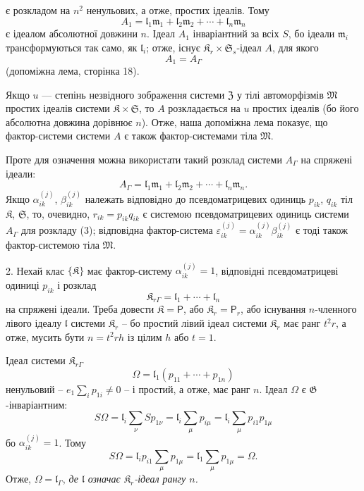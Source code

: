 \documentclass[11pt]{article}
\begin{document}
є розкладом на \(n^2\) ненульових, а отже, простих ідеалів. Тому
\[
A_1=\mathfrak l_1\mathfrak m_1+\mathfrak l_2\mathfrak m_2+\cdots+\mathfrak l_n\mathfrak m_n
\]
є ідеалом абсолютної довжини \(n\). Ідеал \(A_1\) інваріантний за всіх \(S\), бо ідеали \(\mathfrak m_i\) трансформуються так само, як \(\mathfrak l_i\); отже, існує \(\mathfrak K_r\times\mathfrak S_s\)-ідеал \(A\), для якого
\[
A_1=A_\Gamma
\]
(допоміжна лема, сторінка 18).

Якщо \(u\) --- степінь незвідного зображення системи \(\mathfrak Z\) у тілі автоморфізмів \(\mathfrak M\) простих ідеалів системи \(\mathfrak K\times\mathfrak S\), то \(A\) розкладається на \(u\) простих ідеалів (бо його абсолютна довжина дорівнює \(n\)). Отже, наша допоміжна лема показує, що фактор-системи системи \(A\) є також фактор-системами тіла \(\mathfrak M\).

Проте для означення можна використати такий розклад системи \(A_\Gamma\) на спряжені ідеали:
\[
\tag{3}
A_\Gamma=\mathfrak l_1\mathfrak m_1+\mathfrak l_2\mathfrak m_2+\cdots+\mathfrak l_n\mathfrak m_n.
\]
Якщо \(\alpha_{ik}^{(j)}\), \(\beta_{ik}^{(j)}\) належать відповідно до псевдоматрицевих одиниць \(p_{ik}\), \(q_{ik}\) тіл \(\mathfrak K\), \(\mathfrak S\), то, очевидно, \(r_{ik}=p_{ik}q_{ik}\) є системою псевдоматрицевих одиниць системи \(A_\Gamma\) для розкладу (3); відповідна фактор-система \(\varepsilon_{ik}^{(j)}=\alpha_{ik}^{(j)}\beta_{ik}^{(j)}\) є тоді також фактор-системою тіла \(\mathfrak M\).

2. Нехай клас \(\{\mathfrak K\}\) має фактор-систему \(\alpha_{ik}^{(j)}=1\), відповідні псевдоматрицеві одиниці \(p_{ik}\) і розклад
\[
\mathfrak K_{r\Gamma}=\mathfrak l_1+\cdots+\mathfrak l_n
\]
на спряжені ідеали. Треба довести \(\mathfrak K=\mathsf P\), або \(\mathfrak K_r=\mathsf P_r\), або існування \(n\)-членного лівого ідеалу \(\mathfrak l\) системи \(\mathfrak K_r\) -- бо простий лівий ідеал системи \(\mathfrak K_r\) має ранг \(t^2r\), а отже, мусить бути \(n=t^2rh\) із цілим \(h\) або \(t=1\).

Ідеал системи \(\mathfrak K_{r\Gamma}\)
\[
\Omega=\mathfrak l_1(p_{11}+\cdots+p_{1n})
\]
ненульовий -- \(e_1\sum_i p_{1i}\ne0\) -- і простий, а отже, має ранг \(n\). Ідеал \(\Omega\) є \(\mathfrak G\)-інваріантним:
\[
S\Omega
=\mathfrak l_i\sum_\nu S p_{1\nu}
=\mathfrak l_i\sum_\mu p_{i\mu}
=\mathfrak l_i\sum_\mu p_{i1}p_{1\mu}
\]
бо \(\alpha_{ik}^{(j)}=1\). Тому
\[
S\Omega=\mathfrak l_ip_{i1}\sum_\mu p_{1\mu}
=\mathfrak l_1\sum_\mu p_{1\mu}
=\Omega.
\]
Отже, \(\Omega=\mathfrak l_\Gamma\), \emph{де \(\mathfrak l\) означає \(\mathfrak K_r\)-ідеал рангу \(n\).}
\end{document}
